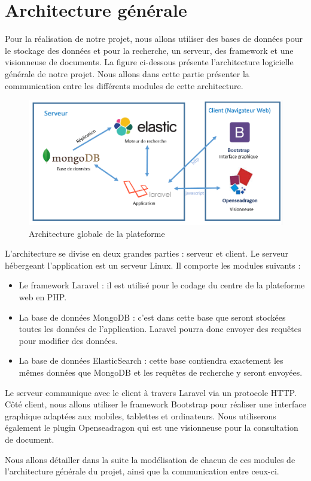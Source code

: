 \newpage
\section{Architecture générale}
\label{sec:generale}

Pour la réalisation de notre projet, nous allons utiliser des bases de données pour le stockage des données et pour la recherche, un serveur, des framework et une visionneuse de documents. La figure ci-dessous présente l'architecture logicielle générale de notre projet. Nous allons dans cette partie présenter la communication entre les différents modules de cette architecture.
    \begin{figure}[H]
        \centering
        \includegraphics[width=\textwidth]{figure/Archi.png}
            \caption{Architecture globale de la plateforme}
            \label{fig:archi}
    \end{figure}

L'architecture se divise en deux grandes parties : serveur et client. 
Le serveur hébergeant l'application est un serveur Linux. Il comporte les modules suivants :
\begin{itemize}
	\item Le framework Laravel : il est utilisé pour le codage du centre de la plateforme web en PHP.
	\item La base de données MongoDB : c'est dans cette base que seront stockées toutes les données de l'application. Laravel pourra donc envoyer des requêtes pour modifier des données.
	\item La base de données ElasticSearch : cette base contiendra exactement les mêmes données que MongoDB et les requêtes de recherche y seront envoyées.
\end{itemize}

Le serveur communique avec le client à travers Laravel via un protocole HTTP. Côté client, nous allons utiliser le framework Bootstrap pour réaliser une interface graphique adaptées aux mobiles, tablettes et ordinateurs. Nous utiliserons également le plugin Openseadragon qui est une visionneuse pour la consultation de document. 

Nous allons détailler dans la suite la modélisation de chacun de ces modules de l'architecture générale du projet, ainsi que la communication entre ceux-ci.
